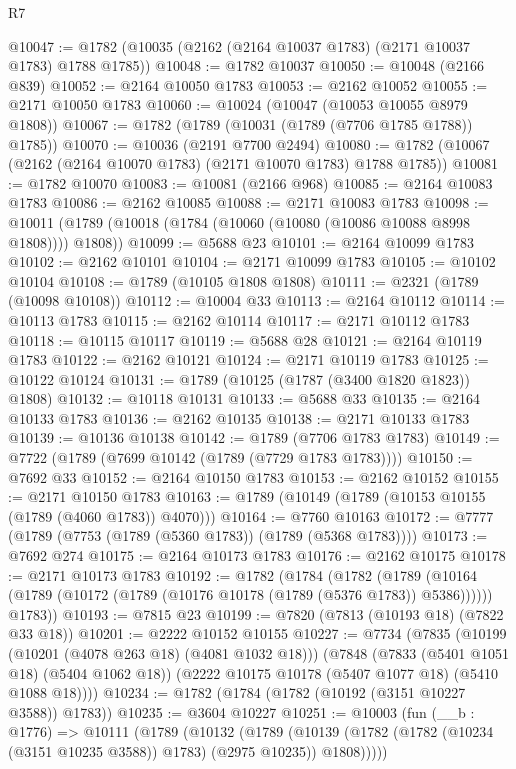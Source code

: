 \begin{lexlean}{R7}
\begin{coremodule}
@10047 := @1782 (@10035 (@2162 (@2164 @10037 @1783) (@2171 @10037 @1783) @1788 @1785))
@10048 := @1782 @10037
@10050 := @10048 (@2166 @839)
@10052 := @2164 @10050 @1783
@10053 := @2162 @10052
@10055 := @2171 @10050 @1783
@10060 := @10024 (@10047 (@10053 @10055 @8979 @1808))
@10067 := @1782 (@1789 (@10031 (@1789 (@7706 @1785 @1788)) @1785))
@10070 := @10036 (@2191 @7700 @2494)
@10080 := @1782 (@10067 (@2162 (@2164 @10070 @1783) (@2171 @10070 @1783) @1788 @1785))
@10081 := @1782 @10070
@10083 := @10081 (@2166 @968)
@10085 := @2164 @10083 @1783
@10086 := @2162 @10085
@10088 := @2171 @10083 @1783
@10098 := @10011 (@1789 (@10018 (@1784 (@10060 (@10080 (@10086 @10088 @8998 @1808)))) @1808))
@10099 := @5688 @23
@10101 := @2164 @10099 @1783
@10102 := @2162 @10101
@10104 := @2171 @10099 @1783
@10105 := @10102 @10104
@10108 := @1789 (@10105 @1808 @1808)
@10111 := @2321 (@1789 (@10098 @10108))
@10112 := @10004 @33
@10113 := @2164 @10112
@10114 := @10113 @1783
@10115 := @2162 @10114
@10117 := @2171 @10112 @1783
@10118 := @10115 @10117
@10119 := @5688 @28
@10121 := @2164 @10119 @1783
@10122 := @2162 @10121
@10124 := @2171 @10119 @1783
@10125 := @10122 @10124
@10131 := @1789 (@10125 (@1787 (@3400 @1820 @1823)) @1808)
@10132 := @10118 @10131
@10133 := @5688 @33
@10135 := @2164 @10133 @1783
@10136 := @2162 @10135
@10138 := @2171 @10133 @1783
@10139 := @10136 @10138
@10142 := @1789 (@7706 @1783 @1783)
@10149 := @7722 (@1789 (@7699 @10142 (@1789 (@7729 @1783 @1783))))
@10150 := @7692 @33
@10152 := @2164 @10150 @1783
@10153 := @2162 @10152
@10155 := @2171 @10150 @1783
@10163 := @1789 (@10149 (@1789 (@10153 @10155 (@1789 (@4060 @1783)) @4070)))
@10164 := @7760 @10163
@10172 := @7777 (@1789 (@7753 (@1789 (@5360 @1783)) (@1789 (@5368 @1783))))
@10173 := @7692 @274
@10175 := @2164 @10173 @1783
@10176 := @2162 @10175
@10178 := @2171 @10173 @1783
@10192 := @1782
    (@1784
      (@1782
        (@1789 (@10164 (@1789 (@10172 (@1789 (@10176 @10178 (@1789 (@5376 @1783)) @5386))))))
        @1783))
@10193 := @7815 @23
@10199 := @7820 (@7813 (@10193 @18) (@7822 @33 @18))
@10201 := @2222 @10152 @10155
@10227 := @7734
    (@7835
      (@10199 (@10201 (@4078 @263 @18) (@4081 @1032 @18)))
      (@7848
        (@7833 (@5401 @1051 @18) (@5404 @1062 @18))
        (@2222 @10175 @10178 (@5407 @1077 @18) (@5410 @1088 @18))))
@10234 := @1782 (@1784 (@1782 (@10192 (@3151 @10227 @3588)) @1783))
@10235 := @3604 @10227
@10251 := @10003
    (fun (__b : @1776) =>
    @10111
      (@1789
        (@10132
          (@1789
            (@10139 (@1782 (@1782 (@10234 (@3151 @10235 @3588)) @1783) (@2975 @10235)) @1808)))))

\end{coremodule}
\end{lexlean}
